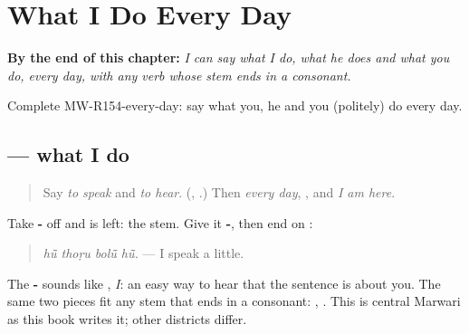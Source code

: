 
\chapter{What I Do Every Day}
\label{ch:mw-a2-what-i-do-every-day}

\begin{chapteropening}
\textbf{By the end of this chapter:} \emph{I can say what I do, what he does and what you do, every day, with any verb whose stem ends in a consonant.}

Complete MW-R154-every-day: say what you, he and you (politely) do every day.
\end{chapteropening}

\section[\texorpdfstring{\mw{बोलूं} \mw{हूं} (bolū̃ hū̃)}{बोलूं हूं (bolū̃ hū̃)}]{   — what I do}

\label{lesson:MW-C154-bolu-hu}



\begin{quote}
Say \emph{to speak} and \emph{to hear}. (\textbf{}, \textbf{}.) Then \emph{every day}, \textbf{}, and \emph{I am here}.
\end{quote}

\begin{grammarlens}[title={Grammar Lens: the stem, -\mw{ूं} and \mw{हूं}}]
Take \textbf{-} off \textbf{} and \textbf{} is left: the stem. Give it \textbf{-}, then end on \textbf{}:

\begin{quote}
\textbf{   }
\end{quote}

\begin{quote}
\emph{hū̃ thoṛu bolū̃ hū̃.} — I speak a little.
\end{quote}

The \textbf{-} sounds like \textbf{}, \emph{I}: an easy way to hear that the sentence is about you. The same two pieces fit any stem that ends in a consonant: \textbf{ }, \textbf{ }. This is central Marwari as this book writes it; other districts differ.
\end{grammarlens}

